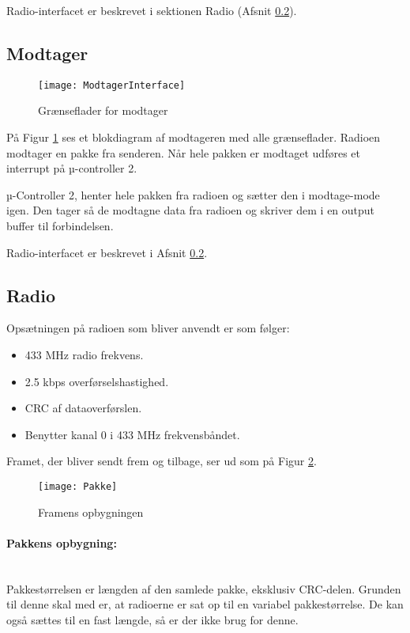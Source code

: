 \documentclass[Main]{subfiles}
\begin{document}
Radio-interfacet er beskrevet i sektionen Radio (Afsnit \ref{Sec:Radio}).



\subsection{Modtager}

\begin{figure}[H]
\centering
\texttt{[image: ModtagerInterface]}
\caption{Grænseflader for modtager}
\label{fig: ModtagerInterface}
\end{figure}

På Figur \ref{fig: ModtagerInterface} ses et blokdiagram af modtageren med alle grænseflader.
Radioen modtager en pakke fra senderen. Når hele pakken er modtaget udføres et interrupt på µ-controller 2.

µ-Controller 2, henter hele pakken fra radioen og sætter den i modtage-mode igen. 
Den tager så de modtagne data fra radioen og skriver dem i en output buffer til \itoc forbindelsen.

Radio-interfacet er beskrevet i Afsnit \ref{Sec:Radio}.


\subsection{Radio} \label{Sec:Radio}

Opsætningen på radioen som bliver anvendt er som følger:
\vspace{-20pt}
\begin{itemize}
\item 433 MHz radio frekvens.
\item 2.5 kbps overførselshastighed.
\item CRC af dataoverførslen.
\item Benytter kanal 0 i 433 MHz frekvensbåndet.
\end{itemize}


Framet, der bliver sendt frem og tilbage, ser ud som på Figur \ref{fig: Pakke}.

\begin{figure}[H]
\centering
\texttt{[image: Pakke]}
\caption{Framens opbygningen}
\label{fig: Pakke}
\end{figure}

\paragraph{Pakkens opbygning:}\mbox{}\\
Pakkestørrelsen er længden af den samlede pakke, eksklusiv CRC-delen. 
Grunden til denne skal med er, at radioerne er sat op til en variabel pakkestørrelse. 
De kan også sættes til en fast længde, så er der ikke brug for denne.
\end{document}
